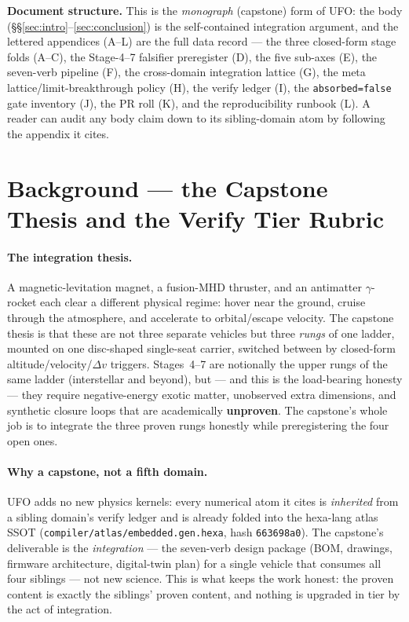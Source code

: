 \documentclass[11pt,a4paper]{article}
\begin{document}
\smallskip\noindent\textbf{Document structure.} This is the
\emph{monograph} (capstone) form of UFO: the body
(\S\S\ref{sec:intro}--\ref{sec:conclusion}) is the self-contained
integration argument, and the lettered appendices (A--L) are the full
data record --- the three closed-form stage folds (A--C), the
Stage-4--7 falsifier preregister (D), the five sub-axes (E), the
seven-verb pipeline (F), the cross-domain integration lattice (G), the
meta lattice/limit-breakthrough policy (H), the verify ledger (I), the
\texttt{absorbed=false} gate inventory (J), the PR roll (K), and the
reproducibility runbook (L). A reader can audit any body claim down to
its sibling-domain atom by following the appendix it cites.

\section{Background --- the Capstone Thesis and the Verify Tier Rubric}
\label{sec:bg}

\paragraph{The integration thesis.} A magnetic-levitation magnet, a
fusion-MHD thruster, and an antimatter $\gamma$-rocket each clear a
different physical regime: hover near the ground, cruise through the
atmosphere, and accelerate to orbital/escape velocity. The capstone
thesis is that these are not three separate vehicles but three
\emph{rungs} of one ladder, mounted on one disc-shaped single-seat
carrier, switched between by closed-form altitude/velocity/$\Delta v$
triggers. Stages~4--7 are notionally the upper rungs of the same ladder
(interstellar and beyond), but --- and this is the load-bearing honesty
--- they require negative-energy exotic matter, unobserved extra
dimensions, and synthetic closure loops that are academically
\textbf{unproven}. The capstone's whole job is to integrate the three
proven rungs honestly while preregistering the four open ones.

\paragraph{Why a capstone, not a fifth domain.} UFO adds no new physics
kernels: every numerical atom it cites is \emph{inherited} from a
sibling domain's verify ledger and is already folded into the hexa-lang
atlas SSOT (\texttt{compiler/atlas/embedded.gen.hexa}, hash
\texttt{663698a0}). The capstone's deliverable is the \emph{integration}
--- the seven-verb design package (BOM, drawings, firmware architecture,
digital-twin plan) for a single vehicle that consumes all four siblings
--- not new science. This is what keeps the work honest: the proven
content is exactly the siblings' proven content, and nothing is upgraded
in tier by the act of integration.
\end{document}

